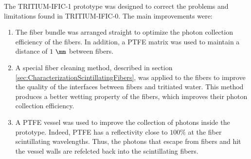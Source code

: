 The TRITIUM-IFIC-1 prototype was designed to correct the problems and limitations found in TRITIUM-IFIC-0. The main improvements were:

\begin{enumerate}

\item{} The fiber bundle was arranged straight to optimize the photon collection efficiency of the fibers. In addition, a PTFE matrix was used to maintain a distance of $1~\mm$ between fibers.

\item{} A special fiber cleaning method, described in section \ref{sec:CharacterizationScintillatingFibers}, was applied to the fibers to improve the quality of the interfaces between fibers and tritiated water. This method produces a better wetting property of the fibers, which improves their photon collection efficiency.

\item{} A PTFE vessel was used to improve the collection of photons inside the prototype. Indeed, PTFE has a reflectivity close to $100\%$ at the fiber scintillating wavelengths. Thus, the photons that escape from fibers and hit the vessel walls are refelcted back into the scintillating fibers.

\end{enumerate}

